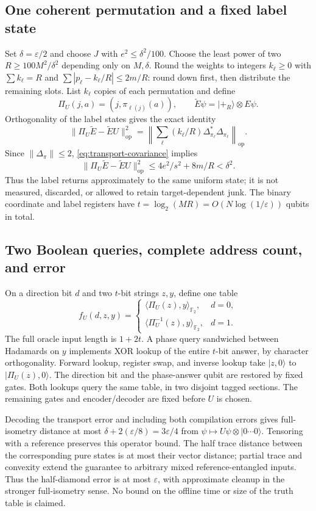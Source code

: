 \documentclass[11pt,a4paper]{article}
\theoremstyle{plain}
\theoremstyle{definition}
\theoremstyle{remark}
\DeclareMathOperator{\op}{op}
\begin{document}
\subsection{One coherent permutation and a fixed label state}
Set $\delta=\varepsilon/2$ and choose $J$ with $e^2\le\delta^2/100$.
Choose the least power of two $R\ge100M^2/\delta^2$ depending only on
$M,\delta$. Round the weights to integers $k_\ell\ge0$ with
$\sum k_\ell=R$ and $\sum|p_\ell-k_\ell/R|\le2m/R$:
round down first, then distribute the remaining slots.
List $k_\ell$ copies of each permutation and define
\[
 \Pi_U(j,a)=(j,\pi_{\ell(j)}(a)),\qquad
 \widetilde E\psi=|+_R\rangle\otimes E\psi.
\]
Orthogonality of the label states gives the exact identity
\[
 \|\Pi_U\widetilde E-\widetilde EU\|_{\op}^2
 =\left\|\sum_\ell(k_\ell/R)\Delta_{\pi_\ell}^*\Delta_{\pi_\ell}\right\|_{\op}.
\]
Since $\|\Delta_\pi\|\le2$, \eqref{eq:transport-covariance} implies
\[
 \|\Pi_U\widetilde E-\widetilde EU\|_{\op}^2
 \le4e^2/s^2+8m/R<\delta^2.
\]
Thus the label returns approximately to the same uniform state;
it is not measured, discarded, or allowed to retain target-dependent junk.
The binary coordinate and label registers have
$t=\log_2(MR)=O(N\log(1/\varepsilon))$ qubits in total.

\subsection{Two Boolean queries, complete address count, and error}
On a direction bit $d$ and two $t$-bit strings $z,y$, define one table
\[
 f_U(d,z,y)=
 \begin{cases}
  \langle\Pi_U(z),y\rangle_{\mathbb F_2},&d=0,\\
  \langle\Pi_U^{-1}(z),y\rangle_{\mathbb F_2},&d=1.
 \end{cases}
\]
The full oracle input length is $1+2t$. A phase query sandwiched
between Hadamards on $y$ implements XOR lookup of the entire
$t$-bit answer, by character orthogonality. Forward lookup, register
swap, and inverse lookup take $|z,0\rangle$ to $|\Pi_U(z),0\rangle$.
The direction bit and the phase-answer qubit are restored by fixed
gates. Both lookups query the same table, in two disjoint tagged sections.
The remaining gates and encoder/decoder are fixed before $U$ is chosen.

Decoding the transport error and including both compilation errors gives
full-isometry distance at most $\delta+2(\varepsilon/8)=3\varepsilon/4$
from $\psi\mapsto U\psi\otimes|0\cdots0\rangle$.
Tensoring with a reference preserves this operator bound.
The half trace distance between the corresponding pure states is at most
their vector distance; partial trace and convexity extend the guarantee
to arbitrary mixed reference-entangled inputs. Thus the half-diamond
error is at most $\varepsilon$, with approximate cleanup in the stronger
full-isometry sense. No bound on the offline time or size of the truth
table is claimed.
\end{document}
